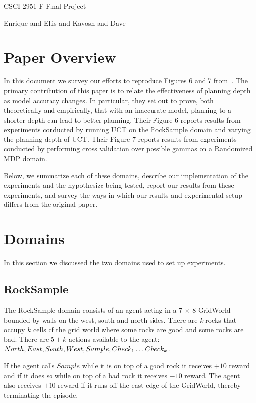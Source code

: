 \documentclass[11pt,twocolumn]{article}
\begin{document}
\centerline{\LARGE{CSCI 2951-F Final Project}}
\centerline{Enrique and Ellis and Kavosh and Dave}
\vspace{2mm}


\section{Paper Overview}

In this document we survey our efforts to reproduce Figures 6 and 7 from~\cite{jiang2015dependence}. The primary contribution of this paper is to relate the effectiveness of planning depth as model accuracy changes. In particular, they set out to prove, both theoretically and empirically, that with an inaccurate model, planning to a shorter depth can lead to better planning. Their Figure 6 reports results from experiments conducted by running UCT on the RockSample domain and varying the planning depth of UCT. Their Figure 7 reports results from experiments conducted by performing cross validation over possible gammas on a Randomized MDP domain.

Below, we summarize each of these domains, describe our implementation of the experiments and the hypothesize being tested, report our results from these experiments, and survey the ways in which our results and experimental setup differs from the original paper.

\section{Domains}

In this section we discussed the two domains used to set up experiments. 
\subsection{RockSample}
\label{sec: rocksample}
The RockSample domain consists of an agent acting in a 7 $\times$ 8 GridWorld bounded by walls on the west, south and north sides. There are $k$ rocks that occupy $k$ cells of the grid world where some rocks are good and some rocks are bad. There are $5+k$ actions available to the agent: $North, East, South, West, Sample, \\
Check_1 \ldots Check_k$.

If the agent calls $Sample$ while it is on top of a good rock it receives $+10$ reward and if it does so while on top of a bad rock it receives $-10$ reward. The agent also receives $+10$ reward if it runs off the east edge of the GridWorld, thereby terminating the episode.
\end{document}
